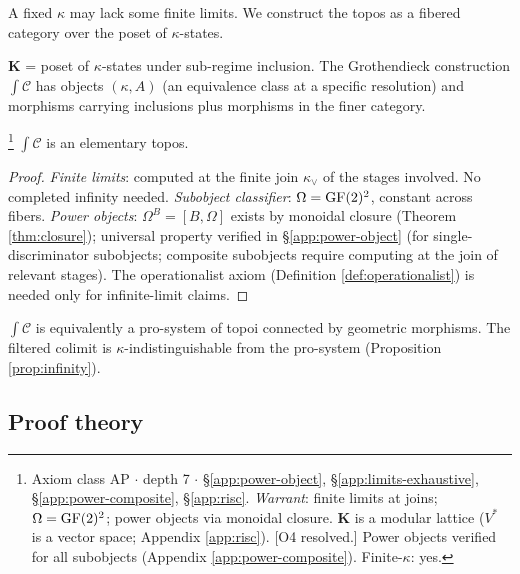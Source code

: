 A fixed $\kappa$ may lack some finite limits. We construct
the topos as a fibered category over the poset of
$\kappa$-states.

\begin{definition}\label{def:fibered}
$\mathbf{K}$ = poset of $\kappa$-states under sub-regime
inclusion. The Grothendieck construction $\int \mathcal{C}$
has objects $(\kappa, A)$ (an equivalence class at a
specific resolution) and morphisms carrying inclusions
plus morphisms in the finer category.
\end{definition}

\begin{theorem}\label{thm:topos}\footnote{Axiom class \textsf{AP} $\cdot$ depth 7 $\cdot$ \S\ref{app:power-object}, \S\ref{app:limits-exhaustive}, \S\ref{app:power-composite}, \S\ref{app:risc}.  \emph{Warrant}: finite limits at joins; $\Omega = \operatorname{GF}(2)^2$; power objects via monoidal closure. $\mathbf{K}$ is a modular lattice ($V^*$ is a vector space; Appendix \ref{app:risc}). [O4 resolved.] Power objects verified for all subobjects (Appendix \ref{app:power-composite}). Finite-$\kappa$: yes.}
$\int \mathcal{C}$ is an elementary topos.
\end{theorem}

\begin{proof}
\emph{Finite limits}: computed at the finite join
$\kappa_\vee$ of the stages involved. No completed infinity
needed. \emph{Subobject classifier}: $\Omega = \operatorname{GF}(2)^2$,
constant across fibers. \emph{Power objects}: $\Omega^B =
[B, \Omega]$ exists by monoidal closure (Theorem
\ref{thm:closure}); universal property verified in
\S\ref{app:power-object} (for single-discriminator
subobjects; composite subobjects require computing
at the join of relevant stages). The operationalist axiom
(Definition \ref{def:operationalist}) is needed only for
infinite-limit claims.
\end{proof}

\begin{corollary}
\label{cor:pro-topos}
$\int \mathcal{C}$ is equivalently a pro-system of topoi
connected by geometric morphisms. The filtered colimit is
$\kappa$-indistinguishable from the pro-system
(Proposition \ref{prop:infinity}).
\end{corollary}

\subsection{Proof theory}\label{sec:proof-theory}

